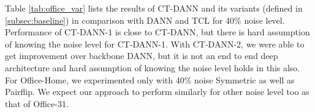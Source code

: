 \begin{center}
\begin{table}[h]
    \centering
    \caption{Classification Accuracy (\%) on \textbf{Office-Home} with 40\% Pairflip noise levels}
    \end{table}
\end{center}
\vspace{-1.2cm}
Table \ref{tab:office_var} lists the results of CT-DANN and its variants (defined in \ref{subsec:baseline}) in comparison with DANN and TCL for 40\% noise level. Performance of CT-DANN-1 is close to CT-DANN, but there is hard assumption of knowing the noise level for CT-DANN-1. With CT-DANN-2, we were able to get improvement over backbone DANN, but it is not an end to end deep architecture and hard assumption of knowing the noise level holds in this also.\\
For Office-Home, we experimented only with 40\% noise Symmetric as well as Pairflip. We expect our approach to perform similarly for other noise level too as that of Office-31.





